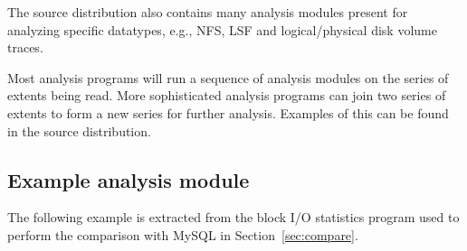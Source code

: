 The \DataSeries{} source distribution also contains many
analysis modules present for analyzing specific datatypes, e.g., NFS, LSF
and logical/physical disk volume traces.

Most analysis programs will run a sequence of analysis modules on the
series of extents being read.  More sophisticated analysis programs
can join two series of extents to form a new series for further
analysis. Examples of this can be found in the \DataSeries{} source distribution.


\subsection{Example analysis module}
The following example is extracted from the block I/O statistics program
used to perform the comparison with MySQL in Section~\ref{sec:compare}.

